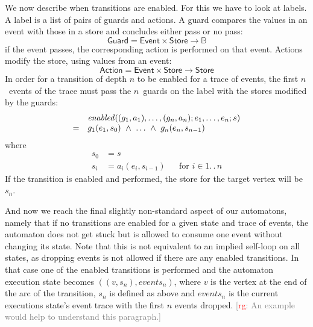 \documentclass[preprint]{sigplanconf} %
\newcommand{\note}[2]{\textcolor{gray}{[\textcolor{red}{#1}: #2]}}
\newcommand{\rg}[1]{\note{rg}{#1}}
\newcommand{\B}{\ensuremath{\mathbb{B}}}
\newcommand{\set}[1]{\ensuremath{\mathsf{#1}}}
\newcommand{\functionfont}[1]{\mathit{#1}}
\newcommand{\enabled}{\functionfont{enabled}}
\theoremstyle{definition}
\theoremstyle{remark}
\begin{document}
We now describe when transitions are enabled. For this we have to look
at labels. A label is a list of pairs of guards and actions. A
guard compares the values in an event with those in a store and
concludes either pass or no pass:
\[
\set{Guard} = \set{Event}\times\set{Store}\to\B
\]
if the event passes, the corresponding action is performed on that event.
Actions modify the store, using values from an event:
\[
\set{Action} = \set{Event}\times\set{Store}\to\set{Store}
\]
In order for a transition of depth $n$ to be enabled for a trace of
events, the first $n$~events of the trace must pass the $n$~guards
on the label with the stores modified by the guards:
\[
\begin{array}{c l}
& \enabled((g_1, a_1), \ldots, (g_n, a_n); e_1, \ldots, e_n; s) \\
 = &
g_1(e_1, s_0)\ \land\ \ldots\ \land\ g_n(e_n, s_{n-1}) 
\end{array}
\]
where
\begin{align}
  s_0 &=  s \\
  s_i &= a_i(e_i, s_{i-1}) &&\text{for $i\in1.\,.\,n$}
\end{align}
If the transition is enabled and performed, the store for the target vertex will be $s_n$.

And now we reach the final slightly non-standard aspect of our
automatons, namely that if no transitions are enabled for a given
state and trace of events, the automaton does not get stuck but is
allowed to consume one event without changing its state. Note that
this is not equivalent to an implied self-loop on all states, as
dropping events is not allowed if there are any enabled
transitions. In that case one of the enabled transitions is performed and
the automaton execution state becomes $((v, s_n), \mathit{events}_n)$, where $v$ is the vertex at the
end of the arc of the transition, $s_n$ is defined as above and
$\mathit{events}_n$ is the current executions state's event trace with the first
$n$ events dropped.
\rg{An example would help to understand this paragraph.}
\end{document}
